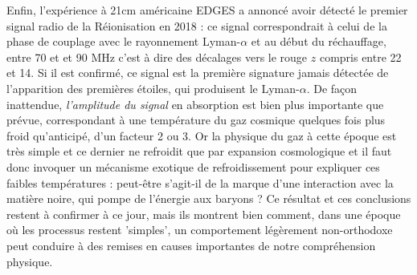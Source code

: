 Enfin, l'expérience à 21cm américaine EDGES  a annoncé avoir détecté le premier signal radio de la Réionisation en 2018 : ce signal correspondrait à celui de la phase de couplage avec le rayonnement Lyman-$\alpha$ et au début du réchauffage, entre 70 et et 90 MHz c'est à dire des décalages vers le rouge $z$ compris entre 22 et 14. Si il est confirmé, ce signal est la première signature jamais détectée de l'apparition des premières étoiles, qui produisent le Lyman-$\alpha$. De façon inattendue, \textit{l'amplitude du signal} en absorption est bien plus importante que prévue, correspondant à une température du gaz cosmique quelques fois plus froid qu'anticipé, d'un facteur 2 ou 3. Or la physique du gaz à cette époque est très simple et ce dernier ne refroidit que par expansion cosmologique et il faut donc invoquer un mécanisme exotique de refroidissement pour expliquer ces faibles températures : peut-être s'agit-il de la marque d'une interaction avec la matière noire, qui pompe de l'énergie aux baryons ? Ce résultat et ces conclusions restent à confirmer à ce jour, mais ils montrent bien comment, dans une époque où les processus restent 'simples', un comportement légèrement non-orthodoxe peut conduire à des remises en causes importantes de notre compréhension physique.  
  
 